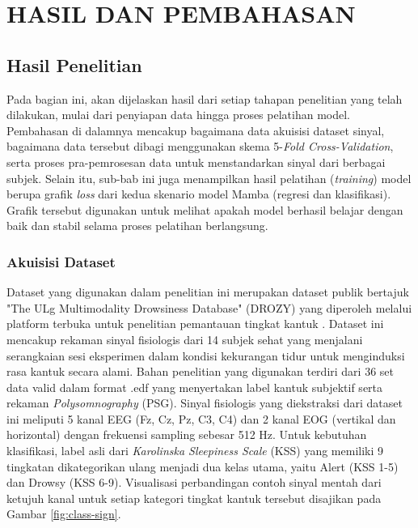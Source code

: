 \newpage
\chapter{HASIL DAN PEMBAHASAN} \label{Bab IV}

\section{Hasil Penelitian} \label{IV.Hasil}
Pada bagian ini, akan dijelaskan hasil dari setiap tahapan penelitian yang telah dilakukan, mulai dari penyiapan data hingga proses pelatihan model. Pembahasan di dalamnya mencakup bagaimana data akuisisi dataset sinyal, bagaimana data tersebut dibagi menggunakan skema 5-\textit{Fold Cross-Validation}, serta proses pra-pemrosesan data untuk menstandarkan sinyal dari berbagai subjek. Selain itu, sub-bab ini juga menampilkan hasil pelatihan (\textit{training}) model berupa grafik \textit{loss} dari kedua skenario model Mamba (regresi dan klasifikasi). Grafik tersebut digunakan untuk melihat apakah model berhasil belajar dengan baik dan stabil selama proses pelatihan berlangsung.

\subsection{Akuisisi Dataset} \label{IV.Akuisisi}
Dataset yang digunakan dalam penelitian ini merupakan dataset publik bertajuk "The ULg Multimodality Drowsiness Database" (DROZY) yang diperoleh melalui platform terbuka untuk penelitian pemantauan tingkat kantuk \cite{Massoz2016}. Dataset ini mencakup rekaman sinyal fisiologis dari 14 subjek sehat yang menjalani serangkaian sesi eksperimen dalam kondisi kekurangan tidur untuk menginduksi rasa kantuk secara alami. Bahan penelitian yang digunakan terdiri dari 36 set data valid dalam format .edf yang menyertakan label kantuk subjektif serta rekaman \textit{Polysomnography} (PSG). Sinyal fisiologis yang diekstraksi dari dataset ini meliputi 5 kanal EEG (Fz, Cz, Pz, C3, C4) dan 2 kanal EOG (vertikal dan horizontal) dengan frekuensi sampling sebesar 512 Hz. Untuk kebutuhan klasifikasi, label asli dari \textit{Karolinska Sleepiness Scale} (KSS) yang memiliki 9 tingkatan dikategorikan ulang menjadi dua kelas utama, yaitu Alert (KSS 1-5) dan Drowsy (KSS 6-9). Visualisasi perbandingan contoh sinyal mentah dari ketujuh kanal untuk setiap kategori tingkat kantuk tersebut disajikan pada Gambar \ref{fig:class-sign}.

